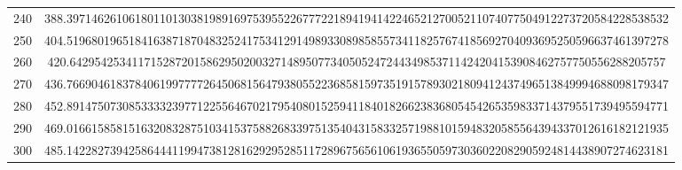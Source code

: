\documentclass[final]{article}
\begin{document}
\begin{table}
\begin{center}
\begin{tabular}{|c|c|}
			240	& 	388.3971462610618011013038198916975395522677722189419414224652127005211074077504912273720584228538532  \\
			250	& 	404.5196801965184163871870483252417534129149893308985855734118257674185692704093695250596637461397278  \\
			260	& 	420.642954253411715287201586295020032714895077340505247244349853711424204153908462757750556288205757  \\
			270	& 	436.7669046183784061997777264506815647938055223685815973519157893021809412437496513849994688098179347  \\
			280	& 	452.8914750730853333239771225564670217954080152594118401826623836805454265359833714379551739495594771  \\
			290	& 	469.0166158581516320832875103415375882683397513540431583325719881015948320585564394337012616182121935  \\
			300	& 	485.1422827394258644411994738128162929528511728967565610619365505973036022082905924814438907274623181  \\
			\hline
			\hline
		\end{tabular}
	\end{center}
	\bigskip\bigskip
\end{table}
\end{document}
